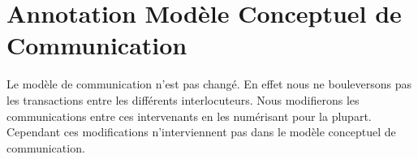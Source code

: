 \section{Annotation Modèle Conceptuel de Communication}

Le modèle de communication n'est pas changé. En effet nous ne bouleversons pas
les transactions entre les différents interlocuteurs. Nous modifierons les 
communications entre ces intervenants en les numérisant pour la plupart.
Cependant ces modifications n'interviennent pas dans le modèle conceptuel
de communication.
